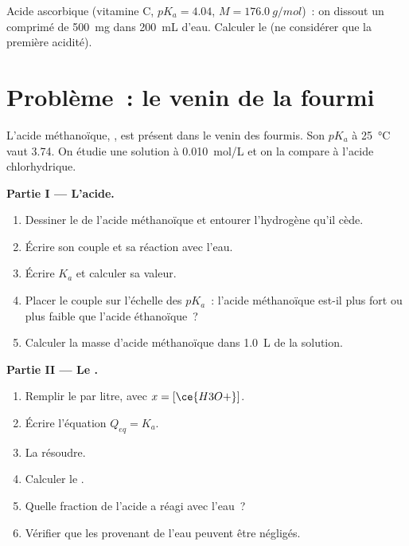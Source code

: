 \begin{exercise}[$\star\star\star$]\label{exo:g12:ka-and-pka:15}
Acide ascorbique (vitamine C, $pK_a = 4.04$, $M = \qty{176.0}{g/mol}$)~:
on dissout un comprimé de \qty{500}{mg} dans \qty{200}{mL} d'eau.
Calculer le  (ne considérer que la première acidité).
\end{exercise}

\section{Problème~: le venin de la fourmi}


\begin{problem}
\label{pb:g12:ka-and-pka:1}
L'acide méthanoïque, , est présent dans le venin des fourmis.
Son $pK_a$ à
\qty{25}{\celsius} vaut 3.74. On étudie une solution à
\qty{0.010}{mol/L} et on la compare à l'acide chlorhydrique.

\medskip
\noindent\textbf{Partie I --- L'acide.}
\begin{enumerate}
  \item Dessiner le  de l'acide méthanoïque et entourer
        l'hydrogène qu'il cède.
  \item Écrire son couple et sa réaction avec l'eau.
  \item Écrire $K_a$ et calculer sa valeur.
  \item Placer le couple sur l'échelle des $pK_a$~: l'acide méthanoïque
        est-il plus fort ou plus faible que l'acide éthanoïque~?
  \item Calculer la masse d'acide méthanoïque dans \qty{1.0}{L} de la
        solution.
\end{enumerate}

\medskip
\noindent\textbf{Partie II --- Le .}
\begin{enumerate}[resume]
  \item Remplir le  par litre, avec
        $x = [\ce{H3O+}]$.
  \item Écrire l'équation $Q_{eq} = K_a$.
  \item La résoudre.
  \item Calculer le .
  \item Quelle fraction de l'acide a réagi avec l'eau~?
  \item Vérifier que les  provenant de l'eau peuvent être négligés.
\end{enumerate}


\end{problem}
